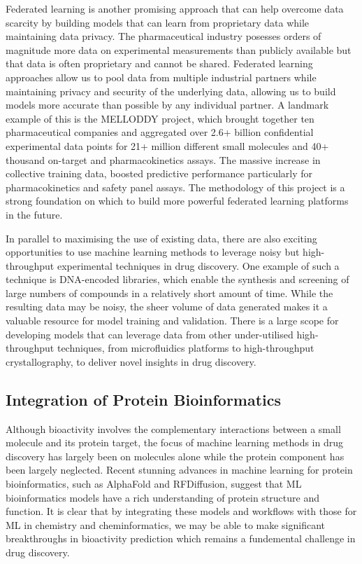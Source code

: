 Federated learning is another promising approach that can help overcome data scarcity by building models that can learn from proprietary data while maintaining data privacy. The pharmaceutical industry posesses orders of magnitude more data on experimental measurements than publicly available but that data is often proprietary and cannot be shared. Federated learning approaches allow us to pool data from multiple industrial partners while maintaining privacy and security of the underlying data, allowing us to build models more accurate than possible by any individual partner. A landmark example of this is the MELLODDY project, which brought together ten pharmaceutical companies and aggregated over 2.6+ billion confidential experimental data points for 21+ million different small molecules and 40+ thousand on-target and pharmacokinetics assays. The massive increase in collective training data, boosted predictive performance particularly for pharmacokinetics and safety panel assays. The methodology of this project is a strong foundation on which to build more powerful federated learning platforms in the future.

In parallel to maximising the use of existing data, there are also exciting opportunities to use machine learning methods to leverage noisy but high-throughput experimental techniques in drug discovery. One example of such a technique is DNA-encoded libraries, which enable the synthesis and screening of large numbers of compounds in a relatively short amount of time. While the resulting data may be noisy, the sheer volume of data generated makes it a valuable resource for model training and validation. There is a large scope for developing models that can leverage data from other under-utilised high-throughput techniques, from microfluidics platforms to high-throughput crystallography, to deliver novel insights in drug discovery.

\subsection{Integration of Protein Bioinformatics}
Although bioactivity involves the complementary interactions between a small molecule and its protein target, the focus of machine learning methods in drug discovery has largely been on molecules alone while the protein component has been largely neglected. Recent stunning advances in machine learning for protein bioinformatics, such as AlphaFold and RFDiffusion, suggest that ML bioinformatics models have a rich understanding of protein structure and function. It is clear that by integrating these models and workflows with those for ML in chemistry and cheminformatics, we may be able to make significant breakthroughs in bioactivity prediction which remains a fundemental challenge in drug discovery.

